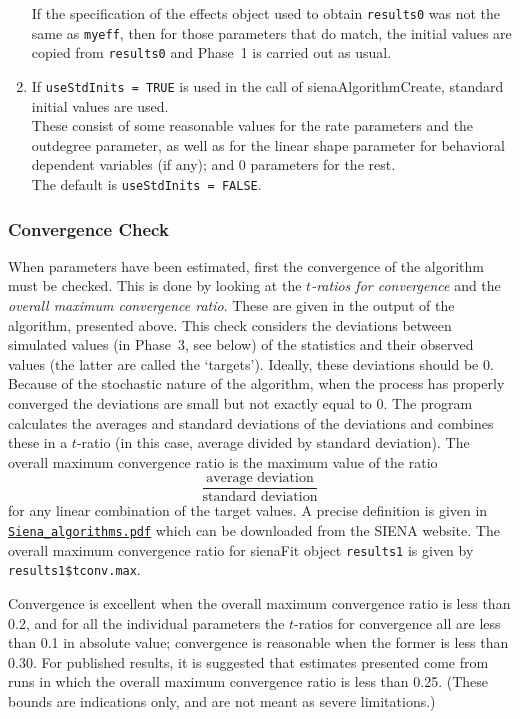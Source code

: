 \documentclass[a4paper,fleqn,11pt]{article}
\newcommand{\+}{\, + \,}
\newcommand{\sfn}[1]{\textsf{#1}}
\newcommand{\SI}{{\sf SIENA }}
\begin{document}
\begin{enumerate}
      If the specification of the effects object used to obtain
      \texttt{results0} was not the same as \texttt{myeff}, then for those
      parameters that do match, the initial values are copied
      from \texttt{results0} and Phase~1 is carried out as usual.
\item If \texttt{useStdInits = TRUE} is used in the call of
      \textsf{sienaAlgorithmCreate}, standard initial values are used.\\
      These consist of some reasonable values for the rate parameters and the
      outdegree parameter, as well as for the linear shape parameter
      for behavioral dependent variables (if any);
      and 0 parameters for the rest.\\
      The default is  \texttt{useStdInits = FALSE}.
\end{enumerate}

\subsubsection{Convergence Check}
\label{S_ccheck}

When parameters have been estimated, first the
\hypertarget{T_convergence}{convergence} of the
algorithm must be checked. This is done by looking at the
\emph{$t$-ratios for convergence} and the
\emph{overall maximum convergence ratio}.
These are given in the output of the algorithm, presented above.
This check
considers the deviations between simulated values
(in Phase~3, see below) of the
statistics and their observed values (the latter are called the
`targets'). Ideally, these deviations should be 0. Because of the
stochastic nature of the algorithm, when the process has properly
converged the deviations are small but not exactly equal to 0.
The program calculates the averages and standard deviations of the
deviations and combines these in a $t$-ratio (in this case,
average divided by standard deviation).
The overall maximum convergence ratio is the maximum value of
the ratio
\[
 \frac{\text{average deviation}}{\text{standard deviation}}
\]
for any linear combination of the target values.
A precise definition is given in \\
\href{http://www.stats.ox.ac.uk/~snijders/siena/Siena_algorithms.pdf}{\texttt{Siena\_algorithms.pdf}}
which can be downloaded from the \SI website.
The overall maximum convergence ratio for \sfn{sienaFit} object \texttt{results1}
is given by  \texttt{results1\$tconv.max}.

Convergence is excellent when the overall maximum convergence ratio
is less than 0.2, and for all the individual parameters the $t$-ratios
for convergence all are less than 0.1 in absolute value;
convergence is reasonable when the former is less than 0.30.
For published results, it is suggested that estimates presented come from runs
in which the overall maximum convergence ratio is less than 0.25.
(These bounds are indications only, and are not meant as severe limitations.)
\end{document}
